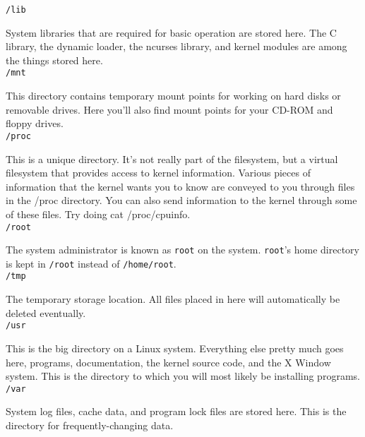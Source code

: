\documentclass[11pt,oneside]{article}
\newenvironment{articleSectionN}[1]
{#1}
{}
\begin{document}
\begin{articleSectionN}
\noindent\lstinline{/lib}

    System libraries that are required for basic operation are stored here. The C library, the dynamic loader, the ncurses library, and kernel modules are among the things stored here.\\
    
\noindent\lstinline{/mnt}

    This directory contains temporary mount points for working on hard disks or removable drives. Here you'll also find mount points for your CD-ROM and floppy drives.\\

\noindent\lstinline{/proc}

    This is a unique directory. It's not really part of the filesystem, but a virtual filesystem that provides access to kernel information. Various pieces of information that the kernel wants you to know are conveyed to you through files in the /proc directory. You can also send information to the kernel through some of these files. Try doing cat /proc/cpuinfo.\\
    
\noindent\lstinline{/root}

    The system administrator is known as \lstinline{root} on the system. \lstinline{root}'s home directory is kept in \lstinline{/root} instead of \lstinline{/home/root}.\\
    
\noindent\lstinline{/tmp}

    The temporary storage location. All files placed in here will automatically be deleted eventually.\\

\noindent\lstinline{/usr}

    This is the big directory on a Linux system. Everything else pretty much goes here, programs, documentation, the kernel source code, and the X Window system. This is the directory to which you will most likely be installing programs.\\

\noindent\lstinline{/var}

    System log files, cache data, and program lock files are stored here. This is the directory for frequently-changing data.\\

    
\end{articleSectionN}
\end{document}

